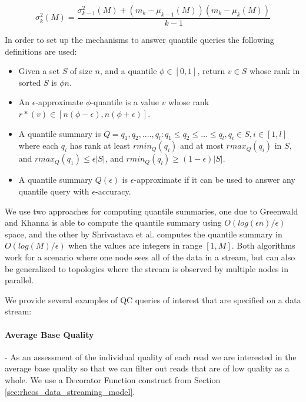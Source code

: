 \begin{equation}
    \label{eq:stream_variance}
    \sigma_k^2(M) =  \frac{\sigma_{k-1}^2(M) + (m_k - \mu_{k-1}(M))(m_k - \mu_k(M))}{k-1} 
\end{equation}

In order to set up the mechanisms to answer quantile queries the following definitions are used\autocite{garofalakis2016data}:

\begin{itemize}
    \item Given a set $S$ of size $n$, and a quantile $\phi \in [0,1]$, return $v \in S$ whose rank in sorted $S$ is $\phi n$. 
    \item An $\epsilon$-approximate $\phi$-quantile is a value $v$ whose rank $r*(v) \in [n(\phi-\epsilon), n(\phi+\epsilon)]$.
    \item A quantile summary is $Q = {q_1,q_2,....,q_l: q_1\le q_2 \le \dots \le q_l, q_i \in S, i \in [1,l]}$ where each $q_i$ has rank at least $rmin_Q(q_i)$ and at most $rmax_Q(q_i)$ in $S$, and $rmax_Q(q_1) \le \epsilon|S|$, and $rmin_Q(q_l) \ge (1-\epsilon)|S|$.
    \item A quantile summary $Q(\epsilon)$ is $\epsilon$-approximate if it can be used to answer any quantile query with $\epsilon$-accuracy.
\end{itemize}

We use two approaches for computing quantile summaries, one due to Greenwald and Khanna\autocite{greenwald2001space} is able to compute the quantile summary using $O(log(\epsilon n)/\epsilon)$ space, and the other by Shrivastava et al.\autocite{shrivastava2004medians} computes the quantile summary in $O(log(M)/\epsilon)$ when the values are integers in range $[1,M]$. Both algorithms work for a scenario where one node sees all of the data in a stream, but can also be generalized to topologies where the stream is observed by multiple nodes in parallel. 

We provide several examples of QC queries of interest that are specified on a data stream:

\paragraph{Average Base Quality} -  As an assessment of the individual quality of each read we are interested in the average base quality so that we can filter out reads that are of low quality as a whole. We use a Decorator Function construct from Section \ref{sec:rheos_data_streaming_model}. 

